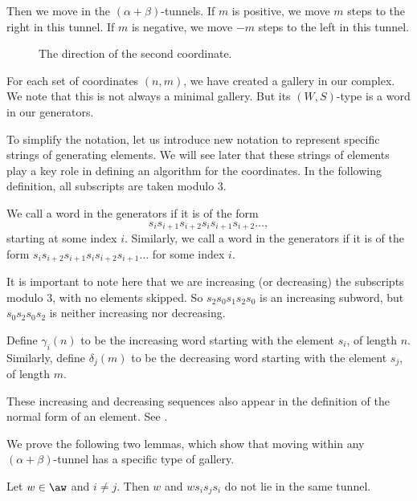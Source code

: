 \documentclass[11pt]{article}
\begin{document}
Then we move in the $(\alpha+\beta)$-tunnels. If $m$ is positive, we move $m$ steps to the right in this tunnel. If $m$ is negative, we move $-m$ steps to the left in this tunnel. 


\begin{figure}[!htbp]
    \centering
    \def\svgwidth{0.4\textwidth}
    
\resizebox{0.4\linewidth}{!}{}
    \caption{The direction of the second coordinate.}
    \label{fig5}
\end{figure}



For each set of coordinates $(n,m)$, we have created a gallery in our complex. We note that this is not always a minimal gallery. But its $(W,S)$-type is a word in our generators. 

To simplify the notation, let us introduce new notation to represent specific strings of generating elements. We will see later that these strings of elements play a key role in defining an algorithm for the coordinates. In the following definition, all subscripts are taken modulo 3. 

\begin{definition}
    We call a word in the generators  if it is of the form \[s_is_{i+1}s_{i+2}s_is_{i+1}s_{i+2}\hdots,\] starting at some index $i$. Similarly, we call a word in the generators  if it is of the form $s_is_{i+2}s_{i+1}s_is_{i+2}s_{i+1}\hdots$ for some index $i$.
\end{definition}

\begin{remark}
    It is important to note here that we are increasing (or decreasing) the subscripts modulo 3, with no elements skipped. So $s_2s_0s_1s_2s_0$ is an increasing subword, but $s_0s_2s_0s_2$ is neither increasing nor decreasing.
\end{remark}

\begin{definition}
    Define $\gamma_i(n)$ to be the increasing word starting with the element $s_i$, of length $n$. Similarly, define $\delta_j(m)$ to be the decreasing word starting with the element $s_j$, of length $m$.
\end{definition}

\begin{remark}
    These increasing and decreasing sequences also appear in the definition of the normal form of an element. See \cite{HECKECATEGORY}.
\end{remark}
We prove the following two lemmas, which show that moving within any $(\alpha+\beta)$-tunnel has a specific type of gallery. 
\begin{lemma}\label{tunnels1}
    Let $w\in \aw$ and $i\neq j$. Then $w$ and $ws_is_js_i$ do not lie in the same tunnel. 
\end{lemma}
\end{document}
